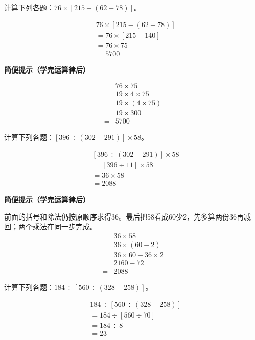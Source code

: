 计算下列各题：\(76\times[215-(62+78)]\)。\par
\begin{BookAnswer}
\[\begin{aligned}&76\times[215-(62+78)]\\&=76\times[215-140]\\&=76\times75\\&=5700\end{aligned}\]\par\textbf{简便提示（学完运算律后）}\par \[\begin{aligned}&76\times75\\={}&19\times4\times75\\={}&19\times(4\times75)\\={}&19\times300\\={}&5700\end{aligned}\]
\end{BookAnswer}

计算下列各题：\([396\div(302-291)]\times58\)。\par
\begin{BookAnswer}
\[\begin{aligned}&[396\div(302-291)]\times58\\&=[396\div11]\times58\\&=36\times58\\&=2088\end{aligned}\]\par\textbf{简便提示（学完运算律后）}\par 前面的括号和除法仍按原顺序求得36。最后把58看成60少2，先多算两份36再减回；两个乘法在同一步完成。\[\begin{aligned}&36\times58\\={}&36\times(60-2)\\={}&36\times60-36\times2\\={}&2160-72\\={}&2088\end{aligned}\]
\end{BookAnswer}

计算下列各题：\(184\div[560\div(328-258)]\)。\par
\begin{BookAnswer}
\[\begin{aligned}&184\div[560\div(328-258)]\\&=184\div[560\div70]\\&=184\div8\\&=23\end{aligned}\]
\end{BookAnswer}

